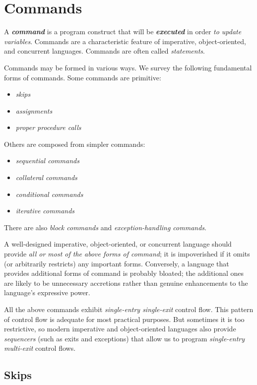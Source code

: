 \section{Commands}
\label{sec:commands}

A \textit{\textbf{command}} is a program construct that will be \textit{\textbf{executed}} in order \textit{to update variables}. Commands are a characteristic feature of imperative, object-oriented, and concurrent languages. Commands are often called \textit{statements}.

Commands may be formed in various ways. We survey the following fundamental forms of commands. Some commands are primitive:
\begin{itemize}
  \item \textit{skips}
  \item \textit{assignments}
  \item \textit{proper procedure calls}
\end{itemize}
Others are composed from simpler commands:
\begin{itemize}
  \item \textit{sequential commands}
  \item \textit{collateral commands}
  \item \textit{conditional commands}
  \item \textit{iterative commands}
\end{itemize}
There are also \textit{block commands} and \textit{exception-handling commands}.

A well-designed imperative, object-oriented, or concurrent language should provide \textit{all or most of the above forms of command}; it is impoverished if it omits (or arbitrarily restricts) any important forms. Conversely, a language that provides additional forms of command is probably bloated; the additional ones are likely to be unnecessary accretions rather than genuine enhancements to the language’s expressive power.

All the above commands exhibit \textit{single-entry single-exit} control flow. This pattern of control flow is adequate for most practical purposes. But sometimes it is too restrictive, so modern imperative and object-oriented languages also provide \textit{sequencers} (such as exits and exceptions) that allow us to program \textit{single-entry multi-exit} control flows.

\subsection{Skips}
\label{sec:skips}

